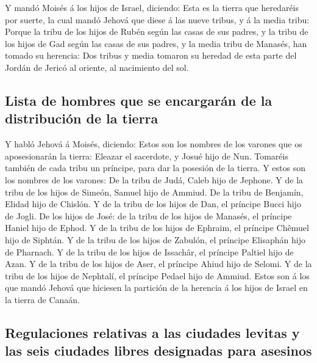  Y mandó Moisés á los hijos de Israel, diciendo: Esta es la
tierra que heredaréis por suerte, la cual mandó Jehová que diese á las
nueve tribus, y á la media tribu:  Porque la tribu de los
hijos de Rubén según las casas de sus padres, y la tribu de los hijos de
Gad según las casas de sus padres, y la media tribu de Manasés, han
tomado su herencia:  Dos tribus y media tomaron su heredad
de esta parte del Jordán de Jericó al oriente, al nacimiento del sol.

\hypertarget{lista-de-hombres-que-se-encargaruxe1n-de-la-distribuciuxf3n-de-la-tierra}{%
\subsection{Lista de hombres que se encargarán de la distribución de la
tierra}\label{lista-de-hombres-que-se-encargaruxe1n-de-la-distribuciuxf3n-de-la-tierra}}

 Y habló Jehová á Moisés, diciendo:  Estos son
los nombres de los varones que os aposesionarán la tierra: Eleazar el
sacerdote, y Josué hijo de Nun.  Tomaréis también de cada
tribu un príncipe, para dar la posesión de la tierra.  Y
estos son los nombres de los varones: De la tribu de Judá, Caleb hijo de
Jephone.  Y de la tribu de los hijos de Simeón, Samuel hijo
de Ammiud.  De la tribu de Benjamín, Elidad hijo de
Chislón.  Y de la tribu de los hijos de Dan, el príncipe
Bucci hijo de Jogli.  De los hijos de José: de la tribu de
los hijos de Manasés, el príncipe Haniel hijo de Ephod.  Y
de la tribu de los hijos de Ephraim, el príncipe Chêmuel hijo de
Siphtán.  Y de la tribu de los hijos de Zabulón, el
príncipe Elisaphán hijo de Pharnach.  Y de la tribu de los
hijos de Issachâr, el príncipe Paltiel hijo de Azan.  Y de
la tribu de los hijos de Aser, el príncipe Ahiud hijo de Selomi.
 Y de la tribu de los hijos de Nephtalí, el príncipe Pedael
hijo de Ammiud.  Estos son á los que mandó Jehová que
hiciesen la partición de la herencia á los hijos de Israel en la tierra
de Canaán.

\hypertarget{regulaciones-relativas-a-las-ciudades-levitas-y-las-seis-ciudades-libres-designadas-para-asesinos}{%
\subsection{Regulaciones relativas a las ciudades levitas y las seis
ciudades libres designadas para
asesinos}\label{regulaciones-relativas-a-las-ciudades-levitas-y-las-seis-ciudades-libres-designadas-para-asesinos}}

